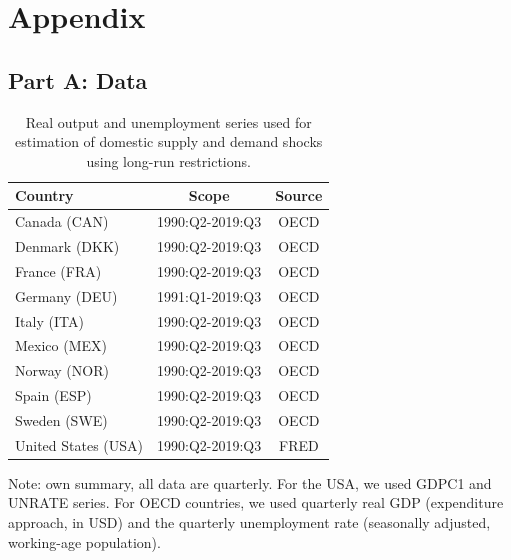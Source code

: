 \documentclass[12pt, a4paper]{article}
\begin{document}
\section*{Appendix}
\renewcommand{\thetable}{A\arabic{table}}
\renewcommand{\thefigure}{B\arabic{figure}}
\setcounter{figure}{0}
\setcounter{table}{0}
\subsection*{Part A: Data} \label{appendix:a}
\begin{table}[H]
\captionsetup{justification=raggedright, singlelinecheck=false}
    \centering
    \caption{Real output and unemployment series used for estimation of domestic supply and demand shocks using long-run restrictions.}
    \begin{tabular}{lcc}
    \toprule
       Country & Scope & Source  \\
    \midrule
       Canada (CAN) & 1990:Q2-2019:Q3 & OECD \\
       Denmark (DKK) & 1990:Q2-2019:Q3 & OECD \\
       France (FRA) & 1990:Q2-2019:Q3 & OECD \\
       Germany (DEU) & 1991:Q1-2019:Q3 & OECD \\
       Italy (ITA) & 1990:Q2-2019:Q3 & OECD \\
       Mexico (MEX) & 1990:Q2-2019:Q3 & OECD \\
       Norway (NOR) & 1990:Q2-2019:Q3 & OECD \\
       Spain (ESP) & 1990:Q2-2019:Q3 & OECD \\
       Sweden (SWE) & 1990:Q2-2019:Q3 & OECD \\
       United States (USA) & 1990:Q2-2019:Q3 & FRED \\
    \bottomrule 
    \end{tabular}
    \begin{minipage}{\textwidth}
    \vspace{0.1cm}
    \footnotesize Note: own summary, all data are quarterly. For the USA, we used GDPC1 and UNRATE series. For OECD countries, we used quarterly real GDP (expenditure approach, in USD) and the quarterly unemployment rate (seasonally adjusted, working-age population).
    \end{minipage}
    \label{table:a1}
\end{table}
\end{document}
